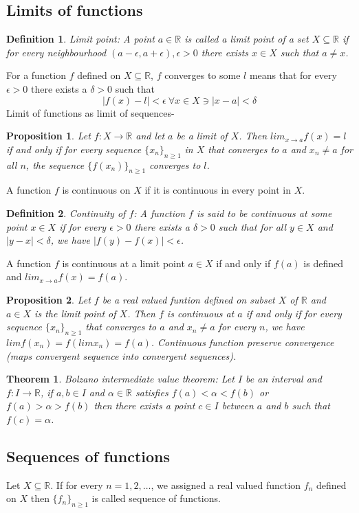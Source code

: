 \documentclass[12pt]{report}
\newtheorem{thm}{Theorem}
\newtheorem{defn}{Definition}
\newtheorem{prop}{Proposition}
\begin{document}
\subsection*{Limits of functions}
\begin{defn}
    Limit point: A point $a \in \mathbb{R}$ is called a limit point of a set $X \subseteq \mathbb{R}$ if for every neighbourhood $(a - \epsilon, a+ \epsilon), \epsilon>0$ there exists $x \in X$ such that $a \neq x$.  
\end{defn}
For a function $f$ defined on $X \subseteq \mathbb{R}$, $f$ converges to some $l$ means that for every $\epsilon > 0$ there exists a $\delta > 0$ such that
$$ |f(x) - l| < \epsilon ~\forall x \in X \ni |x - a| < \delta$$ 
Limit of functions as limit of sequences-
\begin{prop}
    Let $f:X\to \mathbb{R}$ and let $a$ be a limit of $X$. Then $lim_{x \to a} f(x) = l$ if and only if for every sequence $\{x_n\}_{n \geq 1}$ in $X$ that converges to $a$ and $x_n \neq a$ for all $n$, the sequence $\{f(x_n)\}_{n \geq 1}$ converges to $l$. 
\end{prop}
A function $f$ is continuous on $X$ if it is continuous in every point in $X$.
\begin{defn}
    Continuity of $f$: A function $f$ is said to be continuous at some point $x \in X$ if for every $\epsilon > 0$ there exists a $\delta > 0$ such that for all $y \in X$ and $|y - x| < \delta$, we have $|f(y) - f(x)| < \epsilon$.
\end{defn}
A function $f$ is continuous at a limit point $a \in X$ if and only if $f(a)$ is defined and $ lim_{x \to a} f(x) = f(a)$.
\begin{prop}
    Let $f$ be a real valued funtion defined on subset $X$ of $\mathbb{R}$ and $a \in X$ is the limit point of $X$. Then $f$ is continuous at $a$ if and only if for every sequence $\{x_n\}_{n \geq 1}$ that converges to $a$ and $x_n \neq a$ for every $n$, we have $lim f(x_n) = f(lim x_n) = f(a)$. Continuous function preserve convergence (maps convergent sequence into convergent sequences).  
\end{prop}
\begin{thm}
    Bolzano intermediate value theorem: Let $I$ be an interval and $f: I \to \mathbb{R}$, if $a,b \in I$ and $\alpha \in \mathbb{R}$ satisfies $f(a) < \alpha < f(b)$ or $f(a) > \alpha > f(b)$ then there exists a point $c \in I$ between $a$ and $b$ such that $f(c) = \alpha$.
\end{thm}
\subsection*{Sequences of functions}
Let $X \subseteq \mathbb{R}$. If for every $n = 1,2, \dots$, we assigned a real valued function $f_n$ defined on $X$ then $\{f_n\}_{n \geq 1}$ is called sequence of  functions.
\end{document}
